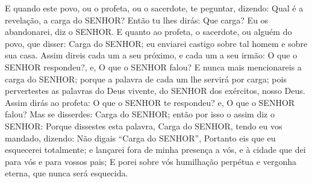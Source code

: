 {E quando este povo, ou o profeta, ou o sacerdote, te peguntar, dizendo: Qual é a revelação, a carga
 do SENHOR? Então tu lhes dirás: Que carga? Eu os abandonarei, diz o SENHOR.
E quanto ao profeta, o sacerdote, ou alguém do povo, que disser: Carga do SENHOR; eu enviarei castigo sobre tal homem e sobre sua casa.
Assim direis cada um a seu próximo, e cada um a seu irmão: O que o SENHOR respondeu?, e, O que o SENHOR falou?
E nunca mais mencionareis a carga do SENHOR; porque a palavra de cada um lhe servirá por carga; pois pervertestes as palavras do Deus vivente, do SENHOR dos exércitos, nosso Deus.
Assim dirás ao profeta: O que o SENHOR te respondeu? e, O que o SENHOR falou?
Mas se disserdes: Carga do SENHOR; então por isso o assim diz o SENHOR: Porque dissestes esta palavra, Carga do SENHOR, tendo eu vos mandado, dizendo: Não digais “Carga do SENHOR”,
Portanto eis que eu esquecerei totalmente; e lançarei fora de minha presença a vós, e à cidade que dei para vós e para vossos pais;
E porei sobre vós humilhação perpétua e vergonha eterna, que nunca será esquecida.

\par }

